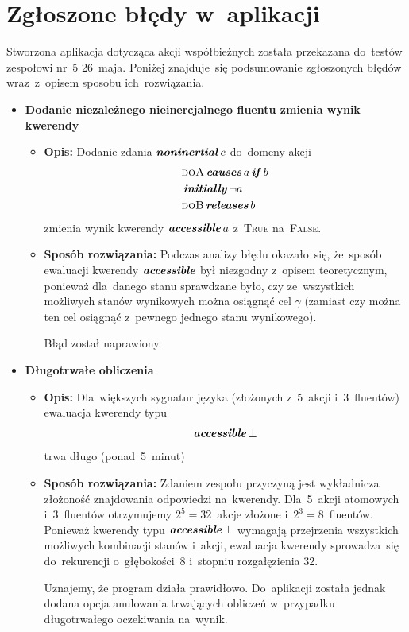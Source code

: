 \documentclass[11pt,a4paper]{article}
\DeclareMathOperator{\Initially}{\textbf{\textit{initially}}}
\DeclareMathOperator{\Causes}{\textbf{\textit{causes}}}
\DeclareMathOperator{\If}{\textbf{\textit{if}}}
\DeclareMathOperator{\Releases}{\textbf{\textit{releases}}}
\DeclareMathOperator{\Noninertial}{\textbf{\textit{noninertial}}}
\DeclareMathOperator{\Accessible}{\textbf{\textit{accessible}}}
\begin{document}
\section{Zgłoszone błędy w~aplikacji}

Stworzona aplikacja dotycząca akcji współbieżnych została przekazana do~testów zespołowi nr~5 26~maja.
Poniżej znajduje~się podsumowanie zgłoszonych błędów wraz~z~opisem sposobu ich~rozwiązania.

\begin{itemize}
    \item \textbf{Dodanie niezależnego nieinercjalnego fluentu zmienia wynik kwerendy}
    \begin{itemize}
        \item \textbf{Opis:}
        Dodanie zdania $\Noninertial c$ do~domeny akcji
        \begin{align*}
            & \textsc{doA} \Causes a \If b \\
            & \Initially \neg a \\
            & \textsc{doB} \Releases b
        \end{align*}
        zmienia wynik kwerendy $\Accessible a$ z~\textsc{True} na~\textsc{False}.
        \item \textbf{Sposób rozwiązania:}
        Podczas analizy błędu okazało~się, że~sposób ewaluacji kwerendy $\Accessible$ był niezgodny z~opisem teoretycznym, ponieważ dla~danego stanu sprawdzane było, czy ze~wszystkich możliwych stanów wynikowych można osiągnąć cel $\gamma$ (zamiast czy można ten cel osiągnąć z~pewnego jednego stanu wynikowego).

        Błąd został naprawiony.
    \end{itemize}
    \item \textbf{Długotrwałe obliczenia}
    \begin{itemize}
        \item \textbf{Opis:}
        Dla~większych sygnatur języka (złożonych z~5~akcji i~3~fluentów) ewaluacja kwerendy typu
        $$ \Accessible \bot $$
        trwa długo (ponad~5~minut)
        \item \textbf{Sposób rozwiązania:}
        Zdaniem zespołu przyczyną jest wykładnicza złożoność znajdowania odpowiedzi na~kwerendy.
        Dla~5~akcji atomowych i~3~fluentów otrzymujemy $2^5 = 32$~akcje złożone i~$2^3 = 8$~fluentów.
        Ponieważ kwerendy typu $\Accessible \bot$ wymagają przejrzenia wszystkich możliwych kombinacji stanów i~akcji, ewaluacja kwerendy sprowadza~się do~rekurencji o~głębokości~8 i~stopniu rozgałęzienia 32.

        Uznajemy, że program działa prawidłowo.
        Do~aplikacji została jednak dodana opcja anulowania trwających obliczeń w~przypadku długotrwałego oczekiwania na~wynik.
    \end{itemize}
\end{itemize}
\end{document}

